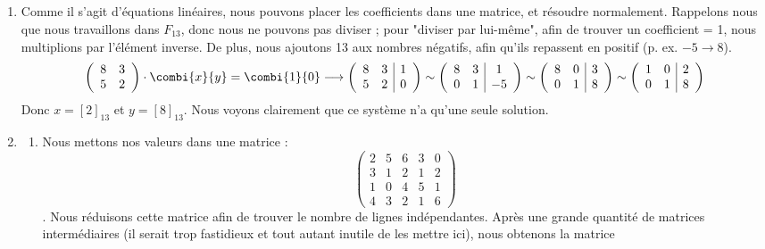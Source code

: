 \documentclass[10p,a4paper]{scrartcl}
\renewcommand{\(}{\left(}
\renewcommand{\)}{\right)}
\begin{document}
\subsection{}
\begin{enumerate}
	\item	Comme il s'agit d'équations linéaires, nous pouvons placer les coefficients dans une matrice, et résoudre normalement. Rappelons nous que nous travaillons dans $F_{13}$, donc nous ne pouvons pas diviser ; pour "diviser par lui-même", afin de trouver un coefficient = 1, nous multiplions par l'élément inverse. De plus, nous ajoutons 13 aux nombres négatifs, afin qu'ils repassent en positif (p. ex. $-5\to 8$).
	\begin{align*}
		\left(\begin{array}{cc}
			8 & 3 \\
			5 & 2 
		\end{array}\right)
		\cdot
		\combi{x}{y}
		=
		\combi{1}{0}
		\longrightarrow
		\left(\begin{array}{cc|c}
			8 & 3 & 1\\
			5 & 2 & 0
		\end{array}\right)
		\sim
		\left(\begin{array}{cc|c}
			8 & 3 & 1\\
			0 & 1 & -5
		\end{array}\right)
		\sim
		\left(\begin{array}{cc|c}
			8 & 0 & 3\\
			0 & 1 & 8
		\end{array}\right)
		\sim
		\left(\begin{array}{cc|c}
			1 & 0 & 2\\
			0 & 1 & 8
		\end{array}\right)
	\end{align*}
	Donc $x = [2]_{13}$ et $y = [8]_{13}$. Nous voyons clairement que ce système n'a qu'une seule solution.
	\item	\begin{enumerate}
				\item 	Nous mettons nos valeurs dans une matrice :
						\[\begin{pmatrix}
							2 & 5 & 6 & 3 & 0\\
							3 & 1 & 2 & 1 & 2\\
							1 & 0 & 4 & 5 & 1\\
							4 & 3 & 2 & 1 & 6
						\end{pmatrix}\]. Nous réduisons cette matrice afin de trouver le nombre de lignes indépendantes. Après une grande quantité de matrices intermédiaires (il serait trop fastidieux et tout autant inutile de les mettre ici), nous obtenons la matrice

\end{enumerate}
\end{enumerate}
\end{document}
